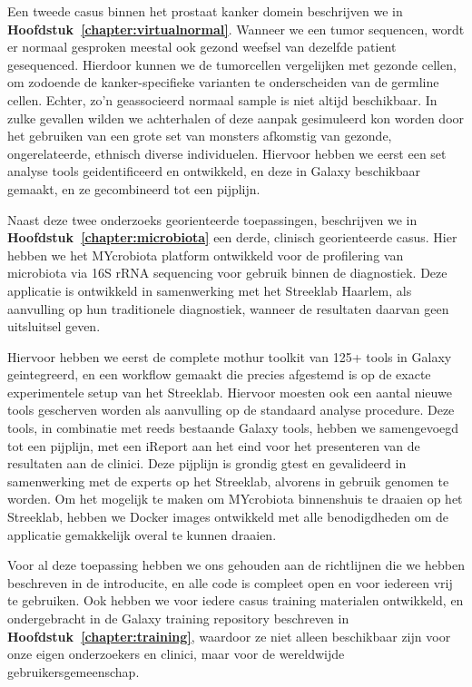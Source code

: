Een tweede casus binnen het prostaat kanker domein beschrijven we in \textbf{Hoofdstuk~\ref{chapter:virtualnormal}}. Wanneer we een tumor sequencen, wordt er normaal gesproken meestal ook gezond weefsel van dezelfde patient gesequenced.
Hierdoor kunnen we de tumorcellen vergelijken met gezonde cellen, om zodoende de kanker-specifieke varianten te onderscheiden van de germline cellen.
Echter, zo'n geassocieerd normaal sample is niet altijd beschikbaar.
In zulke gevallen wilden we achterhalen of deze aanpak gesimuleerd kon worden door het gebruiken van een grote set van monsters afkomstig van gezonde, ongerelateerde, ethnisch diverse individuelen.
Hiervoor hebben we eerst een set analyse tools geidentificeerd en ontwikkeld, en deze in Galaxy beschikbaar gemaakt, en ze gecombineerd tot een pijplijn.

Naast deze twee onderzoeks georienteerde toepassingen, beschrijven we in \textbf{Hoofdstuk~\ref{chapter:microbiota}} een derde, clinisch georienteerde casus. Hier hebben we het MYcrobiota platform ontwikkeld voor de profilering van microbiota via 16S rRNA sequencing voor gebruik binnen de diagnostiek.
Deze applicatie is ontwikkeld in samenwerking met het Streeklab Haarlem, als aanvulling op hun traditionele diagnostiek, wanneer de resultaten daarvan geen uitsluitsel geven.

Hiervoor hebben we eerst de complete mothur toolkit van 125+ tools in Galaxy geintegreerd, en een workflow gemaakt die precies afgestemd is op de exacte experimentele setup van het Streeklab.
Hiervoor moesten ook een aantal nieuwe tools gescherven worden als aanvulling op de standaard analyse procedure.
Deze tools, in combinatie met reeds bestaande Galaxy tools, hebben we samengevoegd tot een pijplijn, met een iReport aan het eind voor het presenteren van de resultaten aan de clinici.
Deze pijplijn is grondig gtest en gevalideerd in samenwerking met de experts op het Streeklab, alvorens in gebruik genomen te worden.
Om het mogelijk te maken om MYcrobiota binnenshuis te draaien op het Streeklab, hebben we Docker images ontwikkeld met alle benodigdheden om de applicatie gemakkelijk overal te kunnen draaien.

Voor al deze toepassing hebben we ons gehouden aan de richtlijnen die we hebben beschreven in de introducite, en alle code is compleet open en voor iedereen vrij te gebruiken. Ook hebben we voor iedere casus training materialen ontwikkeld, en ondergebracht in de Galaxy training repository beschreven in \textbf{Hoofdstuk~\ref{chapter:training}}, waardoor ze niet alleen beschikbaar zijn voor onze eigen onderzoekers en clinici, maar voor de wereldwijde gebruikersgemeenschap.


